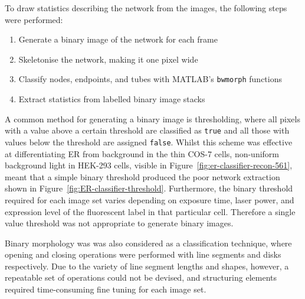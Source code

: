 To draw statistics describing the network from the images, the following steps were performed:
\begin{enumerate}
	\item Generate a binary image of the network for each frame
	\item Skeletonise the network, making it one pixel wide
	\item Classify nodes, endpoints, and tubes with MATLAB's \texttt{bwmorph} functions
	\item Extract statistics from labelled binary image stacks
\end{enumerate}

A common method for generating a binary image is thresholding, where all pixels with a value above a certain threshold are classified as \texttt{true} and all those with values below the threshold are assigned \texttt{false}.
Whilst this scheme was effective at differentiating ER from background in the thin COS-7 cells, non-uniform background light in HEK-293 cells, visible in Figure~\ref{fig:er-classifier-recon-561}, meant that a simple binary threshold produced the poor network extraction shown in Figure~\ref{fig:ER-classifier-threshold}.
Furthermore, the binary threshold required for each image set varies depending on exposure time, laser power, and expression level of the fluorescent label in that particular cell.
Therefore a single value threshold was not appropriate to generate binary images.

Binary morphology was was also considered as a classification technique, where opening and closing operations were performed with line segments and disks respectively. 
Due to the variety of line segment lengths and shapes, however, a repeatable set of operations could not be devised, and structuring elements required time-consuming fine tuning for each image set. 

